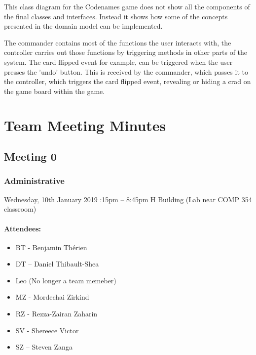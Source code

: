 \documentclass[10pt, a4paper]{article}
\begin{document}
			This class diagram for the Codenames game does not show all the components of the final classes and interfaces. Instead it shows how some of the concepts presented in the domain model can be implemented.  
			
			The commander contains most of the functions the user interacts with, the controller carries out those functions by triggering methods in other parts of the system. The card flipped event for example, can  be triggered when the user presses the 'undo' button. This is received by the commander, which passes it to the controller, which triggers the card flipped event, revealing or hiding a crad on the game board within the game. 
			
			
			\pagebreak 
			
			\section{Team Meeting Minutes}
			\subsection{Meeting 0}
			
			\subsubsection{Administrative}
			Wednesday, 10th January 2019 :15pm – 8:45pm \textbar  H Building (Lab near COMP 354 classroom)  
			\paragraph{Attendees:}
			\begin{itemize}
				\item BT - Benjamin Th\'erien
				\item DT – Daniel Thibault-Shea
				\item Leo (No longer a team memeber)
				\item MZ - Mordechai Zirkind 
				\item RZ - Rezza-Zairan Zaharin
				\item SV - Shereece Victor
				\item SZ – Steven Zanga
			\end{itemize}
			
			
\end{document}

